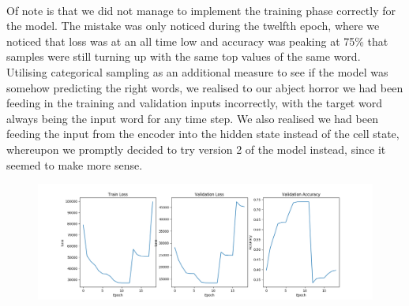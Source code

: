 \documentclass{proc}
\begin{document}
\paragraph{} Of note is that we did not manage to implement the training phase correctly for the model. The mistake was only noticed during the twelfth epoch, where we noticed that loss was at an all time low and accuracy was peaking at 75\% that samples were still turning up with the same top values of the same word. Utilising categorical sampling as an additional measure to see if the model was somehow predicting the right words, we realised to our abject horror we had been feeding in the training and validation inputs incorrectly, with the target word always being the input word for any time step. We also realised we had been feeding the input from the encoder into the hidden state instead of the cell state, whereupon we promptly decided to try version 2 of the model instead, since it seemed to make more sense.
\begin{figure}[h!]
  \includegraphics[width=\linewidth]{image_as_hidden.png}
\end{figure}
\end{document}
